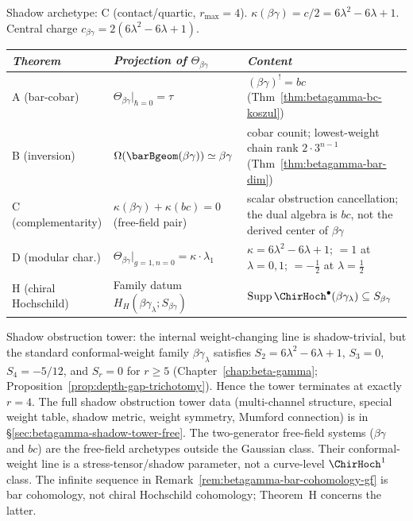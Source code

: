 \begin{computation}
\label{comp:betagamma-five-theorems}
Shadow archetype: C (contact/quartic, $r_{\max} = 4$).
$\kappa(\beta\gamma) = c/2 = 6\lambda^2 - 6\lambda + 1$.
Central charge $c_{\beta\gamma} = 2(6\lambda^2 - 6\lambda + 1)$.
\begin{center}
\small
\renewcommand{\arraystretch}{1.3}
\begin{tabular}{lll}
\toprule
\emph{Theorem} & \emph{Projection of $\Theta_{\beta\gamma}$}
 & \emph{Content} \\
\midrule
A (bar-cobar) &
 $\Theta_{\beta\gamma}\big|_{\hbar=0} = \tau$ &
 $(\beta\gamma)^! = bc$ (Thm~\ref{thm:betagamma-bc-koszul}) \\
B (inversion) &
 $\Omega(\barBgeom(\beta\gamma)) \simeq \beta\gamma$ &
 cobar counit; lowest-weight chain rank $2 \cdot 3^{n-1}$
 (Thm~\ref{thm:betagamma-bar-dim}) \\
C (complementarity) &
 $\kappa(\beta\gamma) + \kappa(bc) = 0$ \textup{(}free-field pair\textup{)} &
 scalar obstruction cancellation; the dual algebra is $bc$, not the
 derived center of $\beta\gamma$ \\
D (modular char.) &
 $\Theta_{\beta\gamma}\big|_{g=1,n=0}
 = \kappa \cdot \lambda_1$ &
 $\kappa = 6\lambda^2{-}6\lambda{+}1$;\; $= 1$ at $\lambda=0,1$;\; $= -\tfrac{1}{2}$ at $\lambda=\tfrac{1}{2}$ \\
H (chiral Hochschild) &
 Family datum $H_H(\beta\gamma_\lambda;S_{\beta\gamma})$ &
 $\operatorname{Supp}\ChirHoch^\bullet(\beta\gamma_\lambda)
 \subseteq S_{\beta\gamma}$ \\
\bottomrule
\end{tabular}
\end{center}
Shadow obstruction tower: the internal weight-changing line is
shadow-trivial, but the standard conformal-weight family
$\beta\gamma_\lambda$ satisfies
$S_2 = 6\lambda^2 - 6\lambda + 1$, $S_3 = 0$, $S_4 = -5/12$,
and $S_r = 0$ for $r \ge 5$
\textup{(}Chapter~\ref{chap:beta-gamma}; Proposition~\ref{prop:depth-gap-trichotomy}\textup{)}.
Hence the tower terminates at exactly $r = 4$.
The full shadow obstruction tower data (multi-channel structure,
special weight table, shadow metric, weight symmetry,
Mumford connection) is in
\S\ref{sec:betagamma-shadow-tower-free}.
The two-generator free-field systems ($\beta\gamma$ and $bc$)
are the free-field archetypes outside the Gaussian class.
Their conformal-weight line is a stress-tensor/shadow parameter, not
a curve-level $\ChirHoch^1$ class.
The infinite sequence in
Remark~\ref{rem:betagamma-bar-cohomology-gf} is bar cohomology, not
chiral Hochschild cohomology; Theorem~H concerns the latter.
\end{computation}

